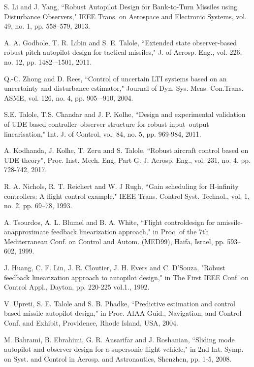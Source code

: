\documentclass[conference]{IEEEtran}
\begin{document}
\begin{thebibliography}{00}
	 S. Li and J. Yang, ``Robust Autopilot Design for Bank-to-Turn Missiles using Disturbance Observers," IEEE Trans. on Aerospace and Electronic Systems, vol. 49, no. 1, pp. 558--579, 2013. \label{dob}
	
	 A. A. Godbole, T. R. Libin and S. E. Talole, ``Extended state observer-based robust pitch autopilot design for tactical missiles," J. of Aerosp. Eng., vol. 226, no. 12, pp. 1482–-1501, 2011. \label{eso}
	
	  Q.-C. Zhong and D. Rees, ``Control of uncertain LTI systems based on an uncertainty and disturbance estimator," Journal of Dyn. Sys. Meas. Con.Trans. ASME, vol. 126, no. 4, pp. 905–-910, 2004. \label{ude1}
	
	 S.E. Talole, T.S. Chandar and J. P. Kolhe, ``Design and experimental validation of UDE based controller--observer structure for robust input--output linearisation," Int. J. of Control, vol. 84, no. 5, pp. 969-984, 2011. \label{talole2011}
	
	 A. Kodhanda, J. Kolhe, T. Zeru and S. Talole, ``Robust aircraft control based on UDE theory", Proc. Inst. Mech. Eng. Part G: J. Aerosp. Eng., vol. 231, no. 4, pp. 728-742, 2017. \label{robust-aircraft-ude}
	
	 R. A. Nichols, R. T. Reichert and W. J Rugh, ``Gain scheduling for H-infinity controllers: A flight control example," IEEE Trans. Control Syst. Technol., vol. 1, no. 2, pp. 69–78, 1993. \label{nichols1993}
		
	 A. Tsourdos, A. L. Blumel and B. A. White, ``Flight controldesign for amissile-anapproximate feedback linearization approach," in Proc. of the 7th Mediterranean Conf. on Control and Autom. (MED99), Haifa, Israel, pp. 593–602, 1999. \label{rd2}
		
	 J. Huang, C. F. Lin, J. R. Cloutier, J. H. Evers and C. D'Souza, "Robust feedback linearization approach to autopilot design," in The First IEEE Conf. on Control Appl., Dayton, pp. 220-225 vol.1., 1992.  \label{huang}	
	
	 V. Upreti, S. E. Talole and S. B. Phadke, ``Predictive estimation and control based missile autopilot design," in Proc. AIAA Guid., Navigation, and Control Conf. and Exhibit, Providence, Rhode Island, USA, 2004. \label{pc_talole}
	
	 M. Bahrami, B. Ebrahimi, G. R. Ansarifar and J. Roshanian, ``Sliding mode autopilot and observer design for a supersonic flight vehicle," in 2nd Int. Symp. on Syst. and Control in Aerosp. and Astronautics, Shenzhen, pp. 1-5, 2008. \label{bahrami} 
	
	
		
	
\end{thebibliography}
\end{document}

